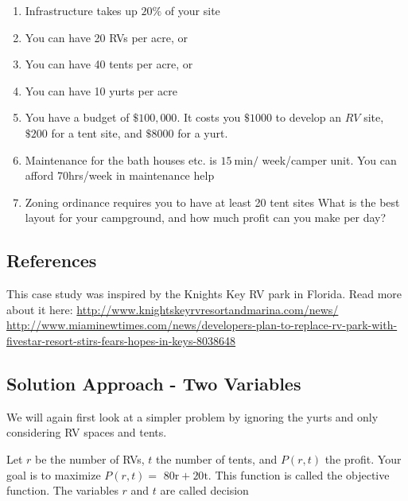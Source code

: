 \begin{enumerate}
  \item Infrastructure takes up $20 \%$ of your site

  \item You can have 20 RVs per acre, or

  \item You can have 40 tents per acre, or

  \item You can have 10 yurts per acre

  \item You have a budget of $\$ 100,000$. It costs you $\$ 1000$ to develop an $R V$ site, $\$ 200$ for a tent site, and $\$ 8000$ for a yurt.

  \item Maintenance for the bath houses etc. is $15 \mathrm{~min} /$ week/camper unit. You can afford 70hrs/week in maintenance help

  \item Zoning ordinance requires you to have at least 20 tent sites What is the best layout for your campground, and how much profit can you make per day?

\end{enumerate}
\subsection{References}
This case study was inspired by the Knights Key RV park in Florida. Read more about it here: \href{http://www.knightskeyrvresortandmarina.com/news/}{http://www.knightskeyrvresortandmarina.com/news/} \href{http://www.miaminewtimes.com/news/developers-plan-to-replace-rv-park-with-fivestar-resort-stirs-fears-hopes-in-keys-8038648}{http://www.miaminewtimes.com/news/developers-plan-to-replace-rv-park-with-fivestar-resort-stirs-fears-hopes-in-keys-8038648}

\subsection{Solution Approach - Two Variables}
We will again first look at a simpler problem by ignoring the yurts and only considering RV spaces and tents.

Let $r$ be the number of RVs, $t$ the number of tents, and $P(r, t)$ the profit. Your goal is to maximize $P(r, t)=$ $80 \mathrm{r}+20 \mathrm{t}$. This function is called the objective function. The variables $r$ and $t$ are called decision

